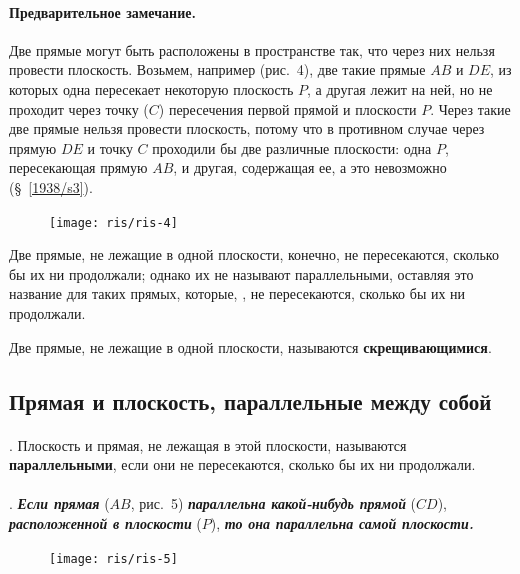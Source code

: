 \documentclass[twoside]{book}
\begin{document}
\paragraph{Предварительное замечание.}\label{1938/s8}
Две прямые могут быть расположены в пространстве так, что через них нельзя провести плоскость.
Возьмем, например (рис.~4), две такие прямые $AB$ и $DE$, из которых одна пересекает некоторую плоскость $P$, а другая лежит на ней, но не проходит через точку ($C$) пересечения первой прямой и плоскости $P$.
Через такие две прямые нельзя провести плоскость, потому что в противном случае через прямую $DE$ и точку $C$ проходили бы две различные плоскости:
одна $P$, пересекающая прямую $AB$, и другая, содержащая ее, а это невозможно (§~\ref{1938/s3}).

\begin{figure}[h!]
\centering
\texttt{[image: ris/ris-4]}
\caption{}
\end{figure}

Две прямые, не лежащие в одной плоскости, конечно, не пересекаются, сколько бы их ни продолжали;
однако их не называют параллельными, оставляя это название для таких прямых, которые, , не пересекаются, сколько бы их ни продолжали.

Две прямые, не лежащие в одной плоскости, называются \textbf{скрещивающимися}.

\subsection*{Прямая и плоскость, параллельные между собой}

\paragraph{}\label{1938/s9}
. Плоскость и прямая, не лежащая в этой плоскости, называются \textbf{параллельными}, если они не пересекаются, сколько бы их ни продолжали.

\paragraph{}\label{1938/s10}
. \textbf{\emph{Если прямая}} ($AB$, рис.~5) \textbf{\emph{параллельна какой-нибудь прямой}} ($CD$), \textbf{\emph{расположенной в плоскости}} ($P$), \textbf{\emph{то она параллельна самой плоскости.}}

\begin{figure}[h!]
\centering
\texttt{[image: ris/ris-5]}
\caption{}
\end{figure}
\end{document}
